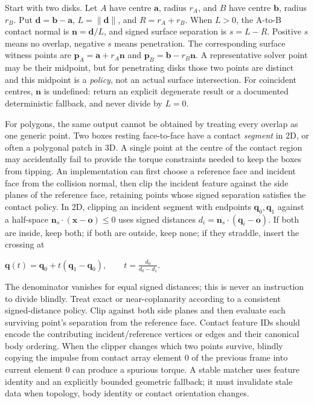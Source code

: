Start with two disks. Let \(A\) have centre \(\mathbf a\), radius \(r_A\), and \(B\) have centre \(\mathbf b\), radius \(r_B\). Put \(\mathbf d=\mathbf b-\mathbf a\), \(L=\|\mathbf d\|\), and \(R=r_A+r_B\). When \(L>0\), the A-to-B contact normal is \(\mathbf n=\mathbf d/L\), and signed surface separation is \(s=L-R\). Positive \(s\) means no overlap, negative \(s\) means penetration. The corresponding surface witness points are \(\mathbf p_A=\mathbf a+r_A\mathbf n\) and \(\mathbf p_B=\mathbf b-r_B\mathbf n\). A representative solver point may be their midpoint, but for penetrating disks those two points are distinct and this midpoint is a \emph{policy}, not an actual surface intersection. For coincident centres, \(\mathbf n\) is undefined: return an explicit degenerate result or a documented deterministic fallback, and never divide by \(L=0\).

For polygons, the same output cannot be obtained by treating every overlap as one generic point. Two boxes resting face-to-face have a contact \emph{segment} in 2D, or often a polygonal patch in 3D. A single point at the centre of the contact region may accidentally fail to provide the torque constraints needed to keep the boxes from tipping. An implementation can first choose a reference face and incident face from the collision normal, then clip the incident feature against the side planes of the reference face, retaining points whose signed separation satisfies the contact policy. In 2D, clipping an incident segment with endpoints \(\mathbf q_0,\mathbf q_1\) against a half-space \(\mathbf n_s\cdot(\mathbf x-\mathbf o)\le0\) uses signed distances \(d_i=\mathbf n_s\cdot(\mathbf q_i-\mathbf o)\). If both are inside, keep both; if both are outside, keep none; if they straddle, insert the crossing at

\(\mathbf q(t)=\mathbf q_0+t(\mathbf q_1-\mathbf q_0), \qquad t=\frac{d_0}{d_0-d_1}.\)

The denominator vanishes for equal signed distances; this is never an instruction to divide blindly. Treat exact or near-coplanarity according to a consistent signed-distance policy. Clip against both side planes and then evaluate each surviving point's separation from the reference face. Contact feature IDs should encode the contributing incident/reference vertices or edges and their canonical body ordering. When the clipper changes which two points survive, blindly copying the impulse from contact array element 0 of the previous frame into current element 0 can produce a spurious torque. A stable matcher uses feature identity and an explicitly bounded geometric fallback; it must invalidate stale data when topology, body identity or contact orientation changes.


